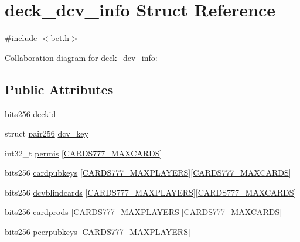 \hypertarget{structdeck__dcv__info}{}\section{deck\+\_\+dcv\+\_\+info Struct Reference}
\label{structdeck__dcv__info}


{\ttfamily \#include $<$bet.\+h$>$}



Collaboration diagram for deck\+\_\+dcv\+\_\+info\+:
\subsection*{Public Attributes}
\begin{DoxyCompactItemize}
\item 
bits256 \hyperlink{structdeck__dcv__info_afcae07e0ab2f88ef3e27e5d3c2e8dd51}{deckid}
\item 
struct \hyperlink{structpair256}{pair256} \hyperlink{structdeck__dcv__info_af771836c5b878645f37a534b4bdc4daa}{dcv\+\_\+key}
\item 
int32\+\_\+t \hyperlink{structdeck__dcv__info_a25fd0412547703e73a77605912374b38}{permis} \mbox{[}\hyperlink{common_8h_a90f0ea2d767ac1915e44acb24a1fe1bd}{C\+A\+R\+D\+S777\+\_\+\+M\+A\+X\+C\+A\+R\+DS}\mbox{]}
\item 
bits256 \hyperlink{structdeck__dcv__info_ae031536026c1fa0fa5c9d2ee431f512d}{cardpubkeys} \mbox{[}\hyperlink{common_8h_a97d6188fd175f4ea7268e9445107a7c0}{C\+A\+R\+D\+S777\+\_\+\+M\+A\+X\+P\+L\+A\+Y\+E\+RS}\mbox{]}\mbox{[}\hyperlink{common_8h_a90f0ea2d767ac1915e44acb24a1fe1bd}{C\+A\+R\+D\+S777\+\_\+\+M\+A\+X\+C\+A\+R\+DS}\mbox{]}
\item 
bits256 \hyperlink{structdeck__dcv__info_a96eea74bbc4a46093273b82ac13dfcef}{dcvblindcards} \mbox{[}\hyperlink{common_8h_a97d6188fd175f4ea7268e9445107a7c0}{C\+A\+R\+D\+S777\+\_\+\+M\+A\+X\+P\+L\+A\+Y\+E\+RS}\mbox{]}\mbox{[}\hyperlink{common_8h_a90f0ea2d767ac1915e44acb24a1fe1bd}{C\+A\+R\+D\+S777\+\_\+\+M\+A\+X\+C\+A\+R\+DS}\mbox{]}
\item 
bits256 \hyperlink{structdeck__dcv__info_a25b24572c534cb608259e8f767d95469}{cardprods} \mbox{[}\hyperlink{common_8h_a97d6188fd175f4ea7268e9445107a7c0}{C\+A\+R\+D\+S777\+\_\+\+M\+A\+X\+P\+L\+A\+Y\+E\+RS}\mbox{]}\mbox{[}\hyperlink{common_8h_a90f0ea2d767ac1915e44acb24a1fe1bd}{C\+A\+R\+D\+S777\+\_\+\+M\+A\+X\+C\+A\+R\+DS}\mbox{]}
\item 
bits256 \hyperlink{structdeck__dcv__info_ab353e16283749de7b5ce105f864733e3}{peerpubkeys} \mbox{[}\hyperlink{common_8h_a97d6188fd175f4ea7268e9445107a7c0}{C\+A\+R\+D\+S777\+\_\+\+M\+A\+X\+P\+L\+A\+Y\+E\+RS}\mbox{]}

\end{DoxyCompactItemize}

